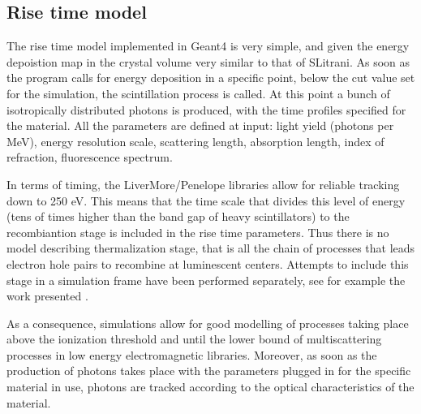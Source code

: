 \subsection{Rise time model}
The rise time model implemented in Geant4 is very simple, and given the energy depoistion map in the crystal volume very similar to that of SLitrani. 
As soon as the program calls for energy deposition in a specific point, below the cut value set for the simulation, the scintillation process is called. 
At this point a bunch of isotropically distributed photons is produced, with the time profiles specified for the material.
All the parameters are defined at input: light yield (photons per MeV), energy resolution scale, scattering length, absorption length, index of refraction, fluorescence spectrum. 

In terms of timing, the LiverMore/Penelope libraries allow for reliable tracking down to 250 eV. This means that the time scale that divides this level of energy (tens of times higher than the band gap of heavy scintillators) to the recombiantion stage is included in the rise time parameters. Thus there is no model describing thermalization stage, that is all the chain of processes that leads electron hole pairs to recombine at luminescent centers. Attempts to include this stage in a simulation frame have been performed separately, see for example the work presented \cite{Vasiliev2013}.

As a consequence, simulations allow for good modelling of processes taking place above the ionization threshold and until the lower bound of multiscattering processes in low energy electromagnetic libraries. Moreover, as soon as the production of photons takes place with the parameters plugged in for the specific material in use, photons are tracked according to the optical characteristics of the material.

